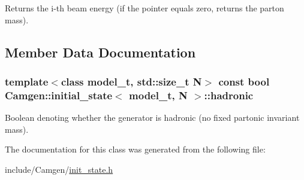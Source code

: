Returns the i-\/th beam energy (if the pointer equals zero, returns the parton mass). 



\subsection{Member Data Documentation}
\hypertarget{a00308_afc30246f82f7c9c7cea2e355ed7b55bf}{}
\subsubsection[{hadronic}]{\setlength{\rightskip}{0pt plus 5cm}template$<$class model\+\_\+t, std\+::size\+\_\+t N$>$ const bool {\bf Camgen\+::initial\+\_\+state}$<$ model\+\_\+t, N $>$\+::hadronic}\label{a00308_afc30246f82f7c9c7cea2e355ed7b55bf}


Boolean denoting whether the generator is hadronic (no fixed partonic invariant mass). 



The documentation for this class was generated from the following file\+:\begin{DoxyCompactItemize}
\item 
include/\+Camgen/\hyperlink{a00669}{init\+\_\+state.\+h}\end{DoxyCompactItemize}
